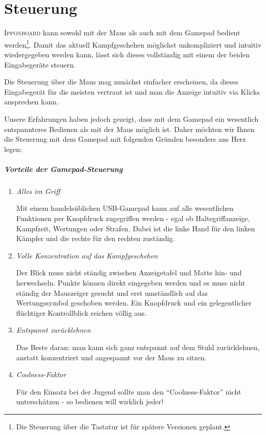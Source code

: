 ﻿\documentclass[11pt,numbers=noenddot]{scrreprt}
\newcommand*{\IB}{\begingroup{\fontspec{Cuprum}\selectfont\textsc{Ipponboard}} \endgroup}
\begin{document}
\chapter{Steuerung}

{\IB} kann sowohl mit der Maus als auch mit dem Gamepad bedient werden\footnote{Die Steuerung über die Tastatur ist für spätere Versionen geplant.}. Damit das aktuell Kampfgeschehen möglichst unkompliziert und intuitiv wiedergegeben werden kann, lässt sich dieses vollständig mit einem der beiden Eingabegeräte
steuern.

Die Steuerung über die Maus mag zunächst einfacher erscheinen, da dieses Eingabegerät für die meisten vertraut ist und man die Anzeige intuitiv via Klicks ansprechen kann.

Unsere Erfahrungen haben jedoch gezeigt, dass mit dem Gamepad ein wesentlich entspannteres Bedienen als mit der Maus möglich ist. Daher möchten wir Ihnen die Steuerung mit dem Gamepad mit folgenden Gründen besonders ans Herz legen:

\paragraph*{Vorteile der Gamepad-Steuerung}
\begin{enumerate}
	\item \textit{Alles im Griff}

	Mit einem handelsüblichen USB-Gamepad kann auf alle wesentlichen Funktionen per Knopfdruck zugegriffen werden \-- egal ob Haltegriffanzeige, Kampfzeit, Wertungen oder Strafen. Dabei ist die linke Hand für den linken Kämpfer und die rechte für den rechten zuständig.

	\item \textit{Volle Konzentration auf das Kampfgeschehen}
	
	Der Blick muss nicht ständig zwischen Anzeigetafel und Matte hin- und herwechseln. Punkte können direkt eingegeben werden und es muss nicht ständig der Mauszeiger gesucht und erst umständlich auf das Wertungssymbol geschoben werden. Ein Knopfdruck und ein gelegentlicher flüchtiger Kontrollblick reichen völlig aus.
	
	\item \textit{Entspannt zurücklehnen}
	
	Das Beste daran: man kann sich ganz entspannt auf dem Stuhl zurücklehnen, anstatt konzentriert und angespannt vor der Maus zu sitzen.

	\item \textit{Coolness-Faktor}
	
	Für den Einsatz bei der Jugend sollte man den "`Coolness-Faktor"' nicht unterschätzen \-- so bedienen will wirklich jeder!
\end{enumerate}
\end{document}
